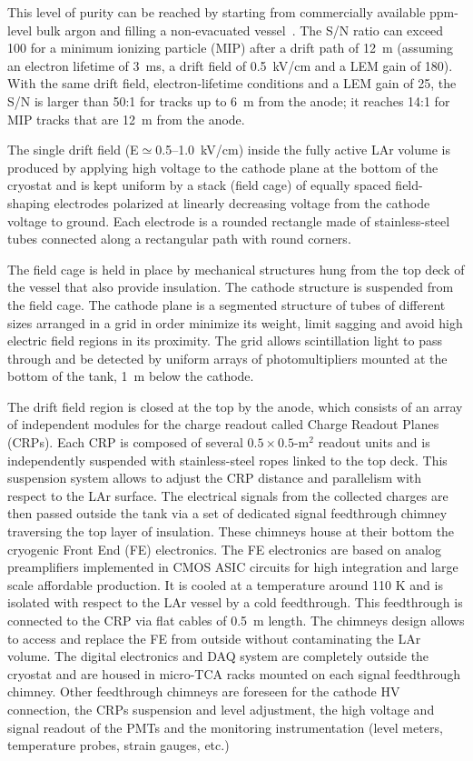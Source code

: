 This level of purity can be reached by starting from commercially available ppm-level bulk argon and filling a non-evacuated vessel~\cite{WA105_TDR}.  The S/N ratio can exceed 100 for a minimum ionizing particle (MIP) after a drift path of 12~m (assuming an electron lifetime of 3~ms, a drift field of
0.5~kV/cm and a LEM gain of 180). With the same drift field,  electron-lifetime conditions and a LEM gain of 25, the S/N is larger than 50:1 for tracks up to 6~m from the anode;  it reaches 14:1 for MIP tracks  that are  12~m from the anode.

The single drift field (E${\simeq}$0.5--1.0~kV/cm) inside the fully active LAr volume is produced by applying high voltage to the cathode plane
at the bottom of the cryostat and is kept uniform by a stack (field cage) of equally spaced field-shaping electrodes polarized at linearly decreasing voltage from the cathode voltage to ground. Each electrode is a rounded rectangle made of stainless-steel tubes connected along a rectangular path with round corners. 

The field cage is held in place by mechanical structures hung from the top deck of the vessel that also provide insulation.  The cathode structure is suspended from the field cage. The cathode plane is a segmented structure of tubes of different sizes arranged in a grid in order minimize its weight, limit sagging and avoid high electric field regions in its proximity.  The grid allows scintillation light to pass through and be detected by uniform arrays of photomultipliers mounted at the bottom of the tank, 1~m below the cathode. 

The drift field region is closed at the top by the anode, which consists of an array of independent modules for the charge readout called Charge Readout Planes  (CRPs). Each CRP is composed of several $0.5\times 0.5$-m$^2$ readout units and is independently suspended with stainless-steel ropes linked to the top deck. This suspension system allows to adjust the CRP distance and parallelism with respect to the LAr surface. The
electrical signals from the collected charges are then passed outside the tank via a set of dedicated signal feedthrough chimney traversing
the top layer of insulation. These chimneys house at their bottom the cryogenic Front End (FE) electronics.  The FE electronics are based on
analog preamplifiers implemented in CMOS ASIC circuits for high integration and large scale affordable production. It is cooled at a
temperature around 110 K and is isolated with respect to the LAr vessel by a cold feedthrough. This feedthrough is connected to the CRP
via flat cables of 0.5~m length. The chimneys design allows to access and replace the FE from outside without contaminating the LAr
volume. The digital electronics and DAQ system are completely outside the cryostat and are housed in micro-TCA racks mounted on each signal
feedthrough chimney. Other feedthrough chimneys are foreseen for the cathode HV connection, the CRPs suspension and level adjustment, the
high voltage and signal readout of the PMTs and the monitoring instrumentation (level meters, temperature probes, strain gauges, etc.)

